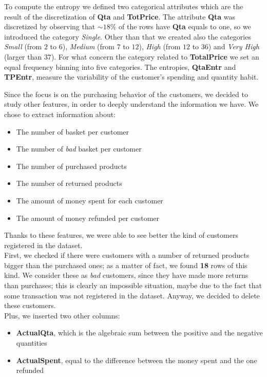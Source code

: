 To compute the entropy we defined two categorical attributes which are the result of the discretization of \textbf{Qta} and \textbf{TotPrice}. The attribute \textbf{Qta} was discretized by observing that $\sim 18\%$ of the rows have \textbf{Qta} equals to one, so we introduced the category \emph{Single}. Other than that we created also the categories \emph{Small}  (from $2$ to $6$), \emph{Medium} (from $7$ to $12$), \emph{High} (from $12$ to $36$) and \emph{Very High} (larger than $37$). For what concern the category related to \textbf{TotalPrice} we set an equal frequency binning into five categories. The entropies, \textbf{QtaEntr} and \textbf{TPEntr}, measure the variability of the customer's spending and quantity habit.

Since the focus is on the purchasing behavior of the customers, we decided to study other features, in order to deeply understand the information we have. We chose to extract information about:
\begin{itemize}
\item The number of basket per customer
\item The number of \emph{bad} basket per customer
\item The number of purchased products
\item The number of returned products
\item The amount of money spent for each customer
\item The amount of money refunded per customer
\end{itemize}

Thanks to these features, we were able to see better the kind of customers registered in the dataset.\\
First, we checked if there were customers with a number of returned products bigger than the purchased ones; as a matter of fact, we found \textbf{18} rows of this kind. We consider these as \emph{bad} customers, since they have made more returns than purchases; this is clearly an impossible situation, maybe due to the fact that some transaction was not registered in the dataset.
Anyway, we decided to delete these customers.\\
Plus, we inserted two other columns:
\begin{itemize}
\item \textbf{ActualQta}, which is the algebraic sum between the positive and the negative quantities
\item \textbf{ActualSpent}, equal to the difference between the money spent and the one refunded
\end{itemize}

